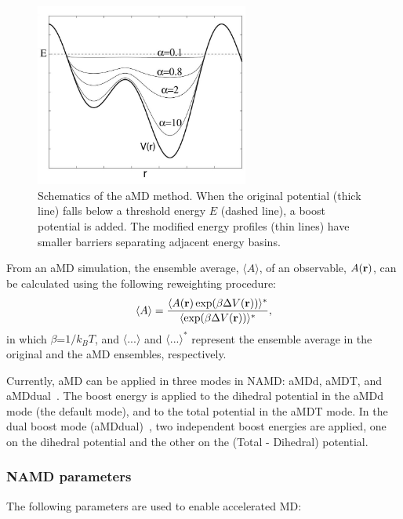 \begin{figure}[!ht]
  \centering
  \includegraphics[width=7cm]{figures/amd_schematic.jpg}
  \caption{Schematics of the aMD method. When the original potential (thick line) falls below a threshold energy $E$ (dashed line),
          a boost potential is added. The modified energy profiles (thin lines) have smaller barriers separating adjacent
	  energy basins. 
	  }
  \label{fig:amd_schematic}
\end{figure}
From an aMD simulation, the ensemble average, $\langle A \rangle$, of an observable, $A({\bf r})$, can be calculated
using the following reweighting procedure:
\begin{equation}
\langle A \rangle =\frac{\langle A({\bf r})\,\text{exp} (\beta \Delta V({\bf r})) \rangle^* }
{\langle \text{exp}  (\beta \Delta V({\bf r})) \rangle^*},
\end{equation}
in which $\beta$=$1/k_BT$, and $\langle ... \rangle$ and $\langle...\rangle^*$ represent 
the ensemble average in the original and the aMD ensembles, respectively. 

Currently, aMD can be applied in three modes in NAMD: aMDd, aMDT, and aMDdual~\cite{WANG2011mc}. The boost energy
is applied to the dihedral potential in the aMDd mode (the default mode), and to the total potential in the aMDT mode.
In the dual boost mode (aMDdual)~\cite{HAME2007mc}, two independent boost energies are applied, one on the dihedral potential and the other
on the (Total - Dihedral) potential.

\subsubsection{NAMD parameters}

The following parameters are used to enable accelerated MD:

